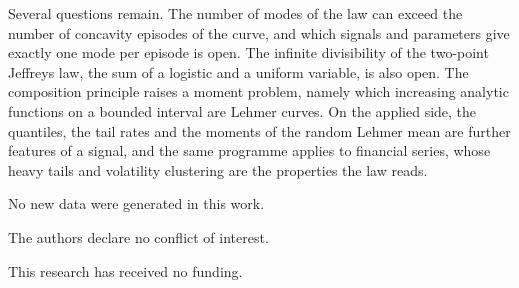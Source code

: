\documentclass[sn-mathphys-num]{sn-jnl}\newcommand{\SNJNL}{}
\theoremstyle{thmstyleone}
\theoremstyle{thmstyletwo}
\theoremstyle{thmstylethree}
\theoremstyle{thmstyleone}
\begin{document}
	Several questions remain. The number of modes of the law can
	exceed the number of concavity episodes of the curve, and which
	signals and parameters give exactly one mode per episode is open. The infinite
	divisibility of the two-point Jeffreys law, the sum of a logistic
	and a uniform variable, is also open. The composition principle
	raises a moment problem, namely which increasing analytic functions
	on a bounded interval are Lehmer curves. On the applied side, the
	quantiles, the tail rates and the moments of the random Lehmer mean
	are further features of a signal, and the same programme applies to financial series, whose heavy
	tails and volatility clustering are the properties the law reads.
	
	No new data were generated in this work.
	
	The authors declare no conflict of interest.
	
	This research has received no funding.
	
\end{document}
